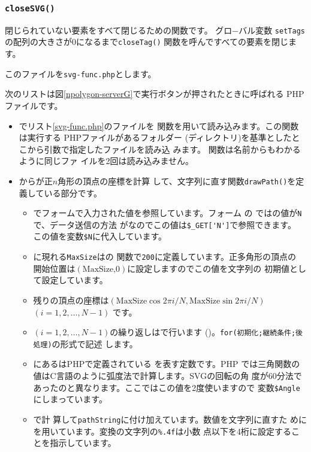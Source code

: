  \subsubsection{\texttt{closeSVG()}}
       閉じられていない要素をすべて閉じるための関数です。
       グロ−バル変数
       \texttt{setTags}の配列の大きさが$0$になるまで\texttt{closeTag()}
       関数を呼んですべての要素を閉じます。

このファイルを\texttt{svg-func.php}とします。

次のリストは図\ref{npolygon-serverG}で実行ボタンが押されたときに呼ばれる
PHPファイルです。
\begin{itemize}
 \item {}でリスト\ref{svg-func.php}のファイルを
       関数を用いて読み込みます。この関数は実行する
       PHPファイルがあるフォルダー
       (ディレクトリ)を基準としたとこから引数で指定したファイルを読み込
       みます。 関数は名前からもわかるように同じファ
       イルを2回は読み込みません。
 \item {}からが正$n$角形の頂点の座標を計算
       して、文字列に直す関数\texttt{drawPath()}を定義している部分です。
\begin{itemize}
 \item {}でフォームで入力された値を参照しています。フォーム
       の
       ではの値が\texttt{N}で、データ送信の方法
       がなのでこの値は\verb+$_GET['N']+で参照できます。
       この値を変数\verb+$N+に代入しています。
 \item {}に現れる\texttt{MaxSize}はの
       関数で\texttt{200}に定義しています。正多角形の頂点の
       開始位置は$(\textrm{MaxSize,0})$に設定しますのでこの値を文字列の
       初期値として設定しています。
 \item 残りの頂点の座標は$(\textrm{MaxSize}\cos 2\pi
       i/N,\textrm{MaxSize}\sin 2\pi i/N)$ 
       $(i=1,2,\ldots,N-1)$ です。
 \item $(i=1,2,\ldots,N-1)$の繰り返しはで行います
       ()。\texttt{for(初期化;継続条件;後処理)}の形式で記述
       します。
 \item {}にあるはPHPで定義されている
       を表す定数です。PHP
       では三角関数の値はC言語のように弧度法で計算します。SVGの回転の角
       度が60分法であったのと異なります。ここではこの値を2度使いますので
       変数\verb+$Angle+にしまっています。
  \item {}で計
       算して\texttt{pathString}に付け加えています。数値を文字列に直すた
       めにを用いています。変換の文字列の\verb+%.4f+は小数
       点以下を4桁に設定することを指示しています。


\end{itemize}
\end{itemize}
